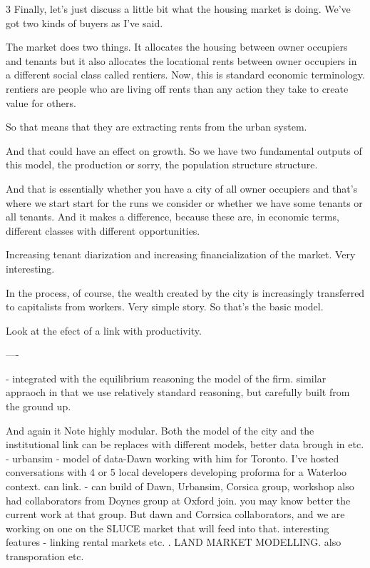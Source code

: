 \documentclass[]{article}
\begin{document}
3 Finally, let's just discuss a little bit what the housing market is doing. We've got two kinds of buyers as I've said.

The market does two things. It allocates the housing between owner occupiers and tenants but it also allocates the locational rents between owner occupiers in a different social class called rentiers. Now, this is standard economic terminology. rentiers are people who are living off  rents than any action they take to create value for others.

So that means that they are extracting rents from the urban system.

And that could have an effect on growth. So we have two fundamental outputs of this model, the production or sorry, the population structure structure.

And that is essentially whether you have a city of all owner occupiers and that's where we start start for the runs we consider or whether we have some tenants or all tenants. And it makes a difference, because these are, in economic terms, different classes with different opportunities.

Increasing tenant diarization and increasing financialization of the market. Very interesting.

In the process, of course, the wealth created by the city is increasingly transferred to capitalists from workers. Very simple story.
So that's the basic model.

Look at the efect of a link with productivity.

----

- integrated with the equilibrium reasoning the model of the firm.
 similar appraoch in that we use relatively standard reasoning, but carefully built from the ground up. 

And again it Note highly modular. Both the model of the city and the institutional link can be replaces with different models, better data brough in etc. - urbansim - model of data-Dawn working with him for Toronto. I've hosted conversations with 4 or 5 local developers developing proforma for a Waterloo context.  can link. 
- can build of Dawn, Urbansim, Corsica group, workshop also had collaborators from Doynes group at Oxford join. you may know better the current work at that group. But dawn and Corrsica collaborators, and we are working on one on the SLUCE market that will feed into that. interesting features - linking rental markets etc. .
LAND MARKET MODELLING.
also transporation etc.
\end{document}
